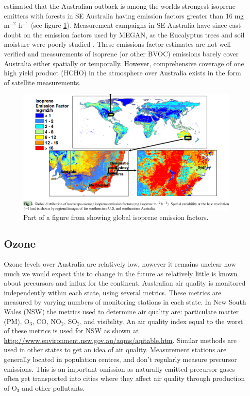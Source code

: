  \textcite{Guenther2006} estimated that the Australian outback is among the worlds strongest isoprene emitters with forests in SE Australia having emission factors greater than 16 mg m$^{-2}$ h$^{-1}$ (see figure \ref{LR:Aus:fig_MEGAN_EF}).
  Measurement campaigns in SE Australia have since cast doubt on the emission factors used by MEGAN, as the Eucalyptus trees and soil moisture were poorly studied \textcite{Emmerson2016}.
  These emissions factor estimates are not well verified and measurements of isoprene (or other BVOC) emissions barely cover Australia either spatially or temporally.
  However, comprehensive coverage of one high yield product (HCHO) in the atmosphere over Australia exists in the form of satellite measurements.
  
  \begin{figure}
    \includegraphics[width=\textwidth]{Figures/MeganIsoprene1.png}
    \caption{ Part of a figure from \textcite{Guenther2006} showing global isoprene emission factors. }
    \label{LR:Aus:fig_MEGAN_EF}
  \end{figure}
  
  
  \subsection{Ozone}
    Ozone levels over Australia are relatively low, however it remains unclear how much we would expect this to change in the future as relatively little is known about precursors and influx for the continent.
    Australian air quality is monitored independently within each state, using several metrics.
    These metrics are measured by varying numbers of monitoring stations in each state.
    In New South Wales (NSW) the metrics used to determine air quality are: particulate matter (PM), O$_3$, CO, NO$_2$, SO$_2$, and visibility.
    An air quality index equal to the worst of these metrics is used for NSW as shown at \url{http://www.environment.nsw.gov.au/aqms/aqitable.htm}.
    Similar methods are used in other states to get an idea of air quality.
    Measurement stations are generally located in population centres, and don't regularly measure precursor emissions. 
    This is an important omission as naturally emitted precursor gases often get transported into cities where they affect air quality through production of O$_3$ and other pollutants.
    
